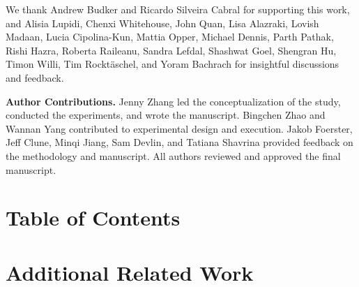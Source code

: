 \documentclass{article}
\begin{document}
\begin{ack}
We thank Andrew Budker and Ricardo Silveira Cabral for supporting this work, and Alisia Lupidi, Chenxi Whitehouse, John Quan, Lisa Alazraki, Lovish Madaan, Lucia Cipolina-Kun, Mattia Opper, Michael Dennis, Parth Pathak, Rishi Hazra, Roberta Raileanu, Sandra Lefdal, Shashwat Goel, Shengran Hu, Timon Willi, Tim Rockt\"aschel, and Yoram Bachrach for insightful discussions and feedback.

\textbf{Author Contributions.}
Jenny Zhang led the conceptualization of the study, conducted the experiments, and wrote the manuscript. Bingchen Zhao and Wannan Yang contributed to experimental design and execution. Jakob Foerster, Jeff Clune, Minqi Jiang, Sam Devlin, and Tatiana Shavrina provided feedback on the methodology and manuscript. All authors reviewed and approved the final manuscript.
\end{ack}




\clearpage

\appendix

\section*{Table of Contents}
\startcontents[sections]
\clearpage


\section{Additional Related Work}
\label{app:related-work}
\end{document}
